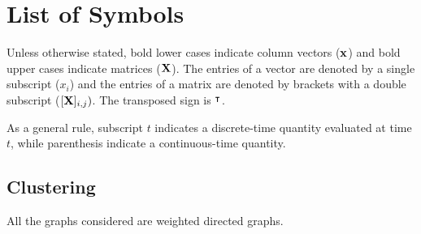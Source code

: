 \section*{List of Symbols}
Unless otherwise stated, bold lower cases indicate column vectors ($\mathbf x$) and bold upper cases indicate matrices ($\mathbf X$). The entries of a vector are denoted by a single subscript ($x_i$) and the entries of a matrix are denoted by brackets with a double subscript ($[\mathbf X]_{i,j})$. The transposed sign is $^\intercal$.

\noindent As a general rule, subscript $t$ indicates a discrete-time quantity evaluated at time $t$, while parenthesis indicate a continuous-time quantity.

\subsection*{Clustering}
All the graphs considered are weighted directed graphs.\\[.5cm]
